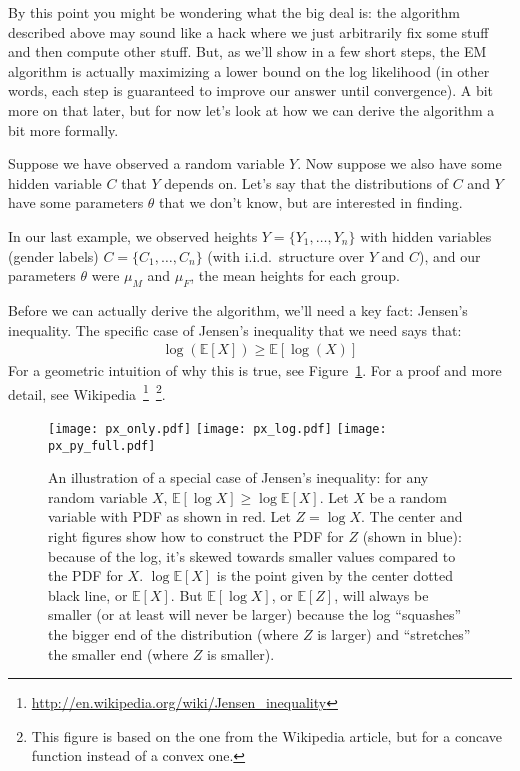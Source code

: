 \documentclass[12pt]{article}
\newcommand{\E}[1]{\mathbb{E}\left[#1\right]}
\begin{document}
    By this point you might be wondering what the big deal is: the algorithm
    described above may sound like a hack where we just arbitrarily fix some
    stuff and then compute other stuff. But, as we'll show in a few short
    steps, the EM algorithm is actually maximizing a lower bound on the log
    likelihood (in other words, each step is guaranteed to improve our answer
    until convergence). A bit more on that later, but for now let's look at how
    we can derive the algorithm a bit more formally.

    Suppose we have observed a random variable $Y$.  Now suppose we also have
    some hidden variable $C$ that $Y$ depends on.  Let's say that the
    distributions of $C$ and $Y$ have some parameters $\theta$ that we don't
    know, but are interested in finding.

    In our last example, we observed heights $Y = \{Y_1, \ldots, Y_n\}$ with
    hidden variables (gender labels) $C = \{C_1, \ldots, C_n\}$ (with i.i.d.\
    structure over $Y$ and $C$), and our parameters $\theta$ were $\mu_M$ and
    $\mu_F$, the mean heights for each group.

    Before we can actually derive the algorithm, we'll need a key fact: Jensen's
    inequality. The specific case of Jensen's inequality that we need
    says that:
    \begin{align}
        \label{eq:jensen-log}\log(\mathbb{E}[X]) \geq \mathbb{E}[\log(X)]
    \end{align}
    For a geometric intuition of why this is true, see Figure~\ref{fig:jensen}.
    For a proof and more detail, see
    Wikipedia~\footnote{\url{http://en.wikipedia.org/wiki/Jensen_inequality}}~\footnote{This
        figure is based on the one from the Wikipedia article, but for a
    concave function instead of a convex one.}.
    \begin{figure}[t]
        \centering
            \hspace*{\fill}
            \texttt{[image: px\_only.pdf]}
            \hfill
            \texttt{[image: px\_log.pdf]}
            \hfill
            \texttt{[image: px\_py\_full.pdf]}
            \hspace*{\fill}
        \caption{An illustration of a special case of Jensen's inequality:
            for any random variable $X$, $\mathbb{E}[\log X] \geq \log \mathbb{E}[X]$. Let
            $X$ be a random variable with PDF as shown in red. Let
            $Z=\log X$. The center and right figures show how to construct
            the PDF for $Z$ (shown in blue): because of the log, it's skewed towards
            smaller values compared to the PDF for $X$. $\log\mathbb{E}[X]$ is the point given by the
            center dotted black line, or $\E{X}$. But $\E{\log X}$, or 
            $\E{Z}$, will always be smaller (or at least will never be larger) because the log ``squashes''
            the bigger end of the distribution (where $Z$ is larger) and ``stretches'' the smaller
            end (where $Z$ is smaller).}
        \label{fig:jensen}
    \end{figure}
\end{document}
